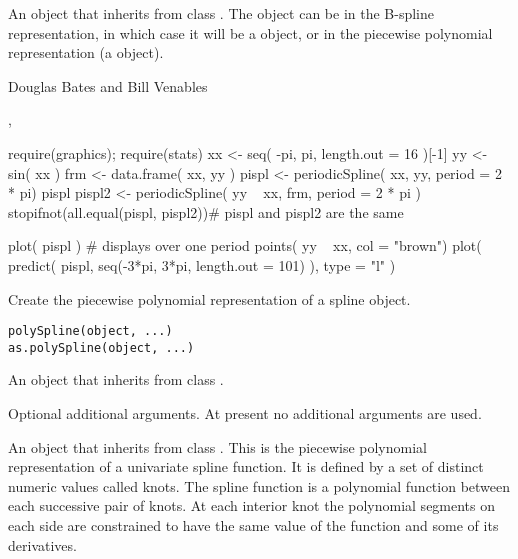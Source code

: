 %
\begin{Value}
An object that inherits from class .  The object can be in
the B-spline representation, in which case it will be a
 object, or in the piecewise polynomial representation
(a  object).
\end{Value}
%
\begin{Author}\relax
Douglas Bates and Bill Venables
\end{Author}
%
\begin{SeeAlso}\relax
{},
\end{SeeAlso}
%
\begin{Examples}
\begin{ExampleCode}
require(graphics); require(stats)
xx <- seq( -pi, pi, length.out = 16 )[-1]
yy <- sin( xx )
frm <- data.frame( xx, yy )
pispl <- periodicSpline( xx, yy, period = 2 * pi)
pispl
pispl2 <- periodicSpline( yy ~ xx, frm, period = 2 * pi )
stopifnot(all.equal(pispl, pispl2))# pispl and pispl2 are the same

plot( pispl )          # displays over one period
points( yy ~ xx, col = "brown")
plot( predict( pispl, seq(-3*pi, 3*pi, length.out = 101) ), type = "l" )
\end{ExampleCode}
\end{Examples}
%
\begin{Description}\relax
Create the piecewise polynomial representation of a spline object.
\end{Description}
%
\begin{Usage}
\begin{verbatim}
polySpline(object, ...)
as.polySpline(object, ...)
\end{verbatim}
\end{Usage}
%
\begin{Arguments}
\begin{ldescription}
\item[\code{object}] An object that inherits from class .
\item[\code{...}] Optional additional arguments.  At present no additional
arguments are used.
\end{ldescription}
\end{Arguments}
%
\begin{Value}
An object that inherits from class .  This is the
piecewise polynomial representation of a univariate spline function.
It is defined by a set of distinct numeric values called knots.  The
spline function is a polynomial function between each successive pair
of knots.  At each interior knot the polynomial segments on each side
are constrained to have the same value of the function and some of its
derivatives.
\end{Value}
